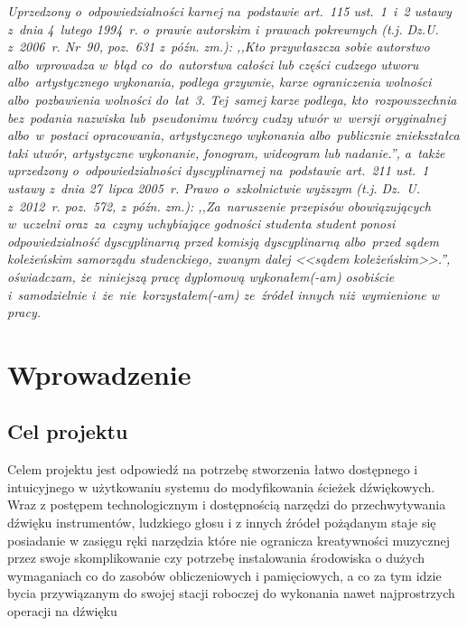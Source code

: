 \documentclass[11pt]{aghdpl}
\begin{document}
\maketitle
\thispagestyle{empty} 
{\large\itshape Uprzedzony o~odpowiedzialno\'sci karnej na~podstawie art.~115 ust.~1~i~2 ustawy z~dnia 4~lutego 1994~r. o~prawie autorskim i~prawach pokrewnych (t.j. Dz.U. z~2006~r. Nr~90, poz.~631 z~p{\'o}{\'z}n. zm.): ,,Kto przyw\l{}aszcza sobie autorstwo albo~wprowadza w~b\l{}\k{a}d co~do~autorstwa ca\l{}o\'sci lub cz\k{e}\'sci cudzego utworu albo~artystycznego wykonania, podlega grzywnie, karze ograniczenia wolno\'sci albo~pozbawienia wolno\'sci do~lat~3. Tej~samej karze podlega, kto~rozpowszechnia bez~podania nazwiska lub~pseudonimu tw\'orcy cudzy utw\'or w~wersji oryginalnej albo~w~postaci opracowania, artystycznego wykonania albo~publicznie zniekszta\l{}ca taki utw\'or, artystyczne wykonanie, fonogram, wideogram lub nadanie.'', a~tak\.ze uprzedzony o~odpowiedzialno\'sci dyscyplinarnej na~podstawie art.~211 ust.~1 ustawy z~dnia 27~lipca 2005~r. Prawo o~szkolnictwie wy\.zszym (t.j. Dz.~U. z~2012~r. poz.~572, z~p\'o\'zn. zm.): ,,Za~naruszenie przepis\'ow obowi\k{a}zuj\k{a}cych w~uczelni oraz~za~czyny uchybiaj\k{a}ce godno\'sci studenta student ponosi odpowiedzialno\'s\'c dyscyplinarn\k{a} przed komisj\k{a} dyscyplinarn\k{a} albo~przed s\k{a}dem kole\.ze\'nskim samorz\k{a}du studenckiego, zwanym dalej <<s\k{a}dem kole\.ze\'nskim>>.'', o\'swiadczam, \.ze~niniejsz\k{a} prac\k{e} dyplomow\k{a} wykona\l{}em(-am) osobi\'scie i~samodzielnie i~\.ze~nie~korzysta\l{}em(-am) ze~\'zr\'ode\l{} innych ni\.z~wymienione w pracy. }
\clearpage
\tableofcontents

\chapter{Wprowadzenie}
\section{Cel projektu} 
\setlength{\parindent}{10ex} \par Celem projektu jest odpowiedź na potrzebę stworzenia łatwo dostępnego i intuicyjnego w użytkowaniu systemu do modyfikowania ścieżek dźwiękowych. Wraz z postępem technologicznym i dostępnością narzędzi do przechwytywania dźwięku instrumentów, ludzkiego głosu i z innych źródeł pożądanym staje się posiadanie w zasięgu ręki narzędzia które nie ogranicza kreatywności muzycznej przez swoje skomplikowanie czy potrzebę instalowania środowiska o dużych wymaganiach co do zasobów obliczeniowych i pamięciowych, a co za tym idzie bycia przywiązanym do swojej stacji roboczej do wykonania nawet najprostrzych operacji na dźwięku
\end{document}
